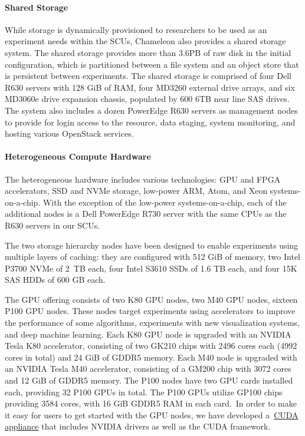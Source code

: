 \paragraph{Shared Storage}\label{shared-storage}

While storage is dynamically provisioned to researchers to be used as an
experiment needs within the SCUs, Chameleon also provides a shared
storage system. The shared storage provides more than 3.6PB of raw disk
in the initial configuration, which is partitioned between a file system
and an object store that is persistent between experiments. The shared
storage is comprised of four Dell R630 servers with 128 GiB of RAM, four
MD3260 external drive arrays, and six MD3060e drive expansion chassis,
populated by 600 6TB near line SAS drives. The system also includes a
dozen PowerEdge R630 servers as management nodes to provide for login
access to the resource, data staging, system monitoring, and hosting
various OpenStack services.


\paragraph{Heterogeneous Compute
Hardware}\label{heterogeneous-compute-hardware}

The heterogeneous hardware includes various technologies: GPU and FPGA
accelerators, SSD and NVMe storage, low-power ARM, Atom, and Xeon
systems-on-a-chip. With the exception of the low-power
systems-on-a-chip, each of the additional nodes is a Dell PowerEdge R730
server with the same CPUs as the R630 servers in our SCUs.

The two storage hierarchy nodes have been designed to enable experiments
using multiple layers of caching: they are configured with 512 GiB of
memory, two Intel P3700 NVMe of 2~TB each, four Intel S3610 SSDs of 1.6
TB each, and four 15K SAS HDDs of 600 GB each.

The GPU offering consists of two K80 GPU nodes, two M40 GPU nodes,
sixteen P100 GPU nodes. These nodes target experiments using
accelerators to improve the performance of some algorithms, experiments
with new visualization systems, and deep machine learning. Each K80 GPU
node is upgraded with an NVIDIA Tesla K80 accelerator, consisting of two
GK210 chips with 2496 cores each (4992 cores in total) and 24 GiB of
GDDR5 memory. Each M40 node is upgraded with an NVIDIA Tesla M40
accelerator, consisting of a GM200 chip with 3072 cores and 12 GiB of
GDDR5 memory. The P100 nodes have two GPU cards installed each,
providing 32 P100 GPUs in total. The P100 GPUs utilize GP100 chips
providing 3584 cores, with 16 GiB GDDR5 RAM in each card.~In order to
make it easy for users to get started with the GPU nodes, we have
developed a~\href{https://www.chameleoncloud.org/appliances/21/}{CUDA
appliance} that includes NVIDIA drivers as well as the CUDA framework.

